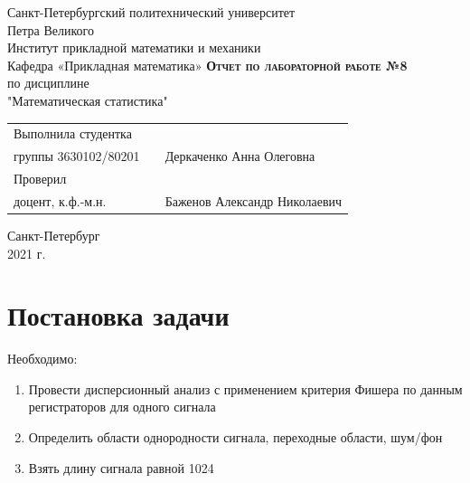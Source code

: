 \documentclass[12pt,a4paper]{article}
\begin{document}
    \begin{titlepage}
        \begin{center}
            \large
            Санкт-Петербургский политехнический университет\\Петра Великого\\
            \vspace{0.5cm}
            Институт прикладной математики и механики\\
            \vspace{0.25cm}
            Кафедра «Прикладная математика»
            \vfill
            \textsc{\LARGE\textbf{Отчет по лабораторной работе №8}}\\[5mm]
            \Large
            по дисциплине\\"Математическая статистика"
        \end{center}
        \vfill
        \begin{tabular}{l p{} l}
            Выполнила студентка\\группы 3630102/80201 && Деркаченко Анна Олеговна
            \vspace{0.25cm}
            \\Проверил\\доцент, к.ф.-м.н. && Баженов Александр Николаевич
        \end{tabular}
        \vfill
        \begin{center}
            Санкт-Петербург\\2021 г.
        \end{center}
    \end{titlepage}

\newpage
\begin{center}
    \tableofcontents
    \setcounter{page}{2}
\end{center}
\newpage
\begin{center}
    \listoffigures
\end{center}

\newpage
\section{Постановка задачи}
Необходимо:
\begin{enumerate}
    \item Провести дисперсионный анализ с применением критерия Фишера по данным регистраторов для одного сигнала
    \item Определить области однородности сигнала, переходные области, шум/фон
    \item Взять длину сигнала равной 1024
\end{enumerate}
\end{document}
